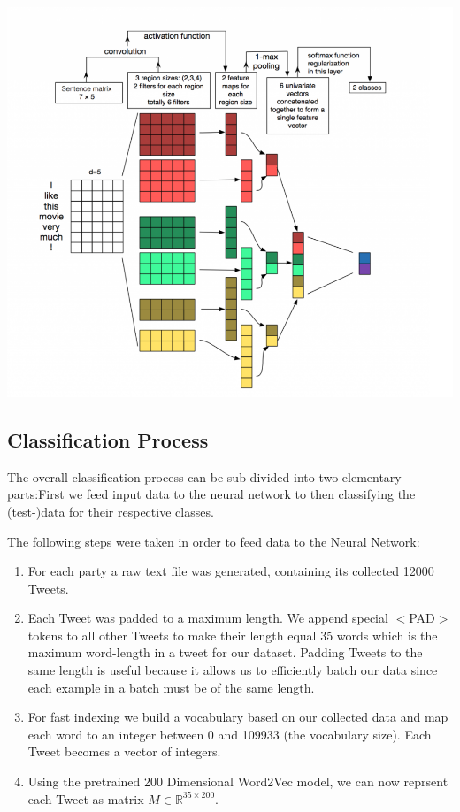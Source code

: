 \documentclass[10pt, oneside]{article}
\newenvironment{Figure}
	{\par\medskip\noindent\minipage{\linewidth}}
	{\endminipage\par\medskip}
\begin{document}
\begin{multicols}{2}
\begin{Figure}
	\centering
	\includegraphics[width=\linewidth]{images/cnn_architecture2.png}
\end{Figure}


\subsection{Classification Process}

The overall classification process can be sub-divided into two elementary parts:First we feed input data to the neural network to then classifying the (test-)data for their respective classes.

The following steps were taken in order to feed data to the Neural Network:

\begin{enumerate}
\item For each party a raw text file was generated, containing its collected 12000 Tweets.
\item Each Tweet was padded to a maximum length. We append special $<$PAD$>$ tokens to all other Tweets to make their length equal 35 words which is the maximum word-length in a tweet for our dataset. Padding Tweets to the same length is useful because it allows us to efficiently batch our data since each example in a batch must be of the same length.
\item For fast indexing we build a vocabulary based on our collected data and map each word to an integer between 0 and 109933 (the vocabulary size). Each Tweet becomes a vector of integers.
\item Using the pretrained 200 Dimensional Word2Vec model, we can now reprsent each Tweet as matrix $M \in \mathbb{R}^{35 \times 200}$.
\end{enumerate}


\end{multicols}
\end{document}

